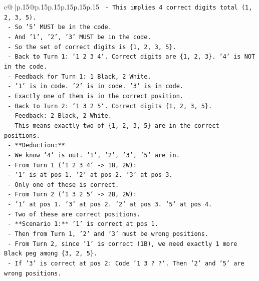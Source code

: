 \documentclass{article}
\begin{document}
{\begin{supertabular}{c@{$\;$}|p{.15\linewidth}@{}p{.15\linewidth}p{.15\linewidth}p{.15\linewidth}p{.15\linewidth}p{.15\linewidth}}
{{{\texttt{          {-} This implies 4 correct digits total (1, 2, 3, 5).} \\
\texttt{          {-} So '5' MUST be in the code.} \\
\texttt{          {-} And '1', '2', '3' MUST be in the code.} \\
\texttt{          {-} So the set of correct digits is \{1, 2, 3, 5\}.} \\
\texttt{          {-} Back to Turn 1: `1 2 3 4`. Correct digits are \{1, 2, 3\}. '4' is NOT in the code.} \\
\texttt{          {-} Feedback for Turn 1: 1 Black, 2 White.} \\
\texttt{            {-} '1' is in code. '2' is in code. '3' is in code.} \\
\texttt{            {-} Exactly one of them is in the correct position.} \\
\texttt{          {-} Back to Turn 2: `1 3 2 5`. Correct digits \{1, 2, 3, 5\}.} \\
\texttt{            {-} Feedback: 2 Black, 2 White.} \\
\texttt{            {-} This means exactly two of \{1, 2, 3, 5\} are in the correct positions.} \\
\texttt{      {-} **Deduction:**} \\
\texttt{        {-} We know '4' is out. '1', '2', '3', '5' are in.} \\
\texttt{        {-} From Turn 1 (`1 2 3 4` {-}> 1B, 2W):} \\
\texttt{          {-} '1' is at pos 1. '2' at pos 2. '3' at pos 3.} \\
\texttt{          {-} Only one of these is correct.} \\
\texttt{        {-} From Turn 2 (`1 3 2 5` {-}> 2B, 2W):} \\
\texttt{          {-} '1' at pos 1. '3' at pos 2. '2' at pos 3. '5' at pos 4.} \\
\texttt{          {-} Two of these are correct positions.} \\
\texttt{        {-} **Scenario 1:** '1' is correct at pos 1.} \\
\texttt{          {-} Then from Turn 1, '2' and '3' must be wrong positions.} \\
\texttt{          {-} From Turn 2, since '1' is correct (1B), we need exactly 1 more Black peg among \{3, 2, 5\}.} \\
\texttt{          {-} If '3' is correct at pos 2: Code `1 3 ? ?`. Then '2' and '5' are wrong positions.} \\
}}}
\end{supertabular}}
\end{document}

